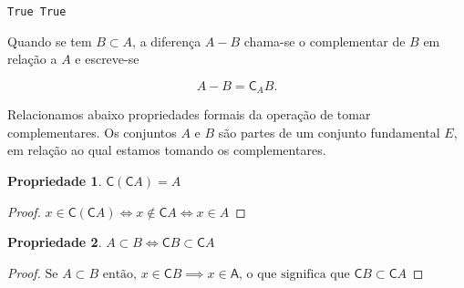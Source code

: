 \documentclass{book}
\newtheorem{propriedade}{Propriedade}[section]
\begin{document}
\begin{Verbatim}[commandchars=\\\{\},frame=leftline,fontsize=\small, xleftmargin=0.5em]
True True
\end{Verbatim}


        Quando se tem $B \subset A$, a diferença $A - B$ chama-se o complementar de $B$ em relação a $A$ e escreve-se

        $$A - B = \mathsf{C}_A B \text{.}$$

        Relacionamos abaixo propriedades formais da operação de tomar complementares. Os conjuntos $A$ e $B$ são partes de um conjunto fundamental $E$, em relação ao qual estamos tomando os complementares.

        \begin{propriedade}
            $\mathsf{C}\left( \mathsf{C}A\right) = A$
        \end{propriedade}

        \begin{proof}
            $x \in \mathsf{C}(\mathsf{C}A) \iff x \notin \mathsf{C}A \iff x \in A$
        \end{proof}

        \begin{propriedade}
            $A \subset B \iff \mathsf{C}B \subset \mathsf{C}A$
        \end{propriedade}

        \begin{proof}
            $\text{Se } A \subset B \text{ então, }x \in \mathsf{C}B \implies x \in \mathsf{A}\text{, o que significa que }\mathsf{C}B \subset \mathsf{C}A$
        \end{proof}
\end{document}
